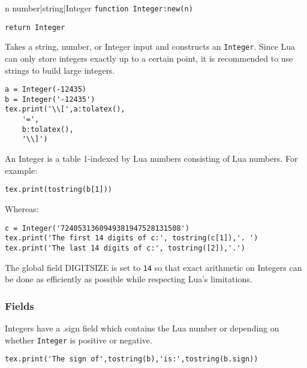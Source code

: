 \documentclass{article}
\newcommand{\newcoderef}[3]{%
\begin{newcodehead}[sidebyside,segmentation hidden]{#3}%
    \texttt{#1}%
    \tcblower%
    \begin{flushright}%
    \texttt{#2}%
    \end{flushright}%
\end{newcodehead}%
}
\begin{document}
\newcoderef{function Integer:new(n)}{return Integer}{n number|string|Integer}

Takes a string, number, or {\ttfamily Integer} input and constructs an \texttt{Integer}. Since Lua can only store integers exactly up to a certain point, it is recommended to use strings to build large integers.

\begin{codebox}
    \begin{verbatim}
a = Integer(-12435)
b = Integer('-12435')
tex.print('\\[',a:tolatex(),
    '=',
    b:tolatex(),
    '\\]')
\end{verbatim}
\tcblower
{}
\end{codebox}
An {\ttfamily Integer} is a table 1-indexed by Lua numbers consisting of Lua numbers. For example:
\begin{codebox}
    \begin{verbatim}
tex.print(tostring(b[1]))
\end{verbatim}
\tcblower
{}
\end{codebox}
Whereas:
\begin{codebox}[]
    \begin{verbatim}
c = Integer('7240531360949381947528131508')
tex.print('The first 14 digits of c:', tostring(c[1]),'. ')
tex.print('The last 14 digits of c:', tostring([2]),'.')
\end{verbatim}
\tcblower
{}
\end{codebox}

The global field {\ttfamily DIGITSIZE} is set to \texttt{14} so that exact arithmetic on {\ttfamily Integer}s can be done as efficiently as possible while respecting Lua's limitations.

\subsubsection*{Fields}
{\ttfamily Integer}s have a {\ttfamily .sign} field which contains the Lua number {} or {} depending on whether \texttt{Integer} is positive or negative. 
\begin{codebox}[]
    \begin{verbatim}
tex.print('The sign of',tostring(b),'is:',tostring(b.sign))
\end{verbatim}
\tcblower
{}
\end{codebox}
\end{document}

